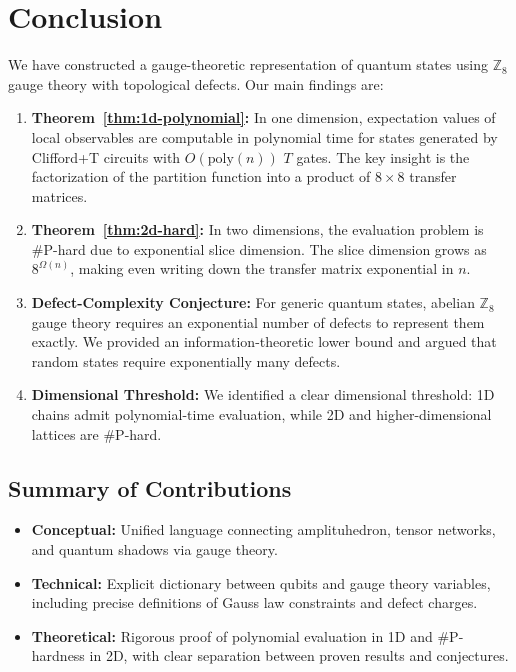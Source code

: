 \section{Conclusion}

We have constructed a gauge-theoretic representation of quantum states using $\mathbb{Z}_8$ gauge theory with topological defects. Our main findings are:

\begin{enumerate}
    \item \textbf{Theorem~\ref{thm:1d-polynomial}:} In one dimension, expectation values of local observables are computable in polynomial time for states generated by Clifford+T circuits with $O(\text{poly}(n))$ $T$ gates. The key insight is the factorization of the partition function into a product of $8\times8$ transfer matrices.
    
    \item \textbf{Theorem~\ref{thm:2d-hard}:} In two dimensions, the evaluation problem is \#P-hard due to exponential slice dimension. The slice dimension grows as $8^{\Omega(n)}$, making even writing down the transfer matrix exponential in $n$.
    
    \item \textbf{Defect-Complexity Conjecture:} For generic quantum states, abelian $\mathbb{Z}_8$ gauge theory requires an exponential number of defects to represent them exactly. We provided an information-theoretic lower bound and argued that random states require exponentially many defects.
    
    \item \textbf{Dimensional Threshold:} We identified a clear dimensional threshold: 1D chains admit polynomial-time evaluation, while 2D and higher-dimensional lattices are \#P-hard.
\end{enumerate}

\subsection{Summary of Contributions}

\begin{itemize}
    \item \textbf{Conceptual:} Unified language connecting amplituhedron, tensor networks, and quantum shadows via gauge theory.
    \item \textbf{Technical:} Explicit dictionary between qubits and gauge theory variables, including precise definitions of Gauss law constraints and defect charges.
    \item \textbf{Theoretical:} Rigorous proof of polynomial evaluation in 1D and \#P-hardness in 2D, with clear separation between proven results and conjectures.
\end{itemize}

